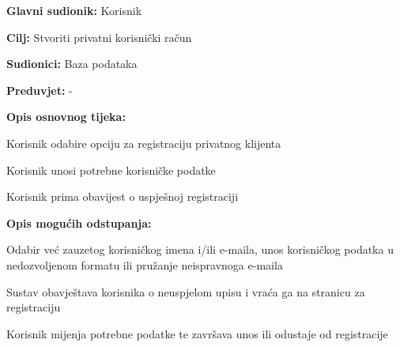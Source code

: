 			
					\noindent {}
					\begin{packed_item}
						
						\item \textbf{Glavni sudionik: } Korisnik
						\item  \textbf{Cilj:} Stvoriti privatni korisnički račun
						\item  \textbf{Sudionici:} Baza podataka
						\item  \textbf{Preduvjet:} -
						\item  \textbf{Opis osnovnog tijeka:}
						
						\item[] \begin{packed_enum}
							
							\item Korisnik odabire opciju za registraciju privatnog klijenta
							\item Korisnik unosi potrebne korisničke podatke
							\item Korisnik prima obavijest o uspješnoj registraciji
						\end{packed_enum}
						
						\item  \textbf{Opis mogućih odstupanja:}
						
						\item[] \begin{packed_item}
							
							\item[2.a]  Odabir već zauzetog korisničkog imena i/ili e-maila, unos korisničkog podatka u nedozvoljenom formatu ili pružanje neispravnoga e-maila
							\item[] \begin{packed_enum}
								
								\item Sustav obavještava korisnika o neuspjelom upisu i vraća ga na stranicu za registraciju
								\item  Korisnik mijenja potrebne podatke te završava unos ili odustaje od registracije
								
							\end{packed_enum}
						\end{packed_item}
					\end{packed_item}
				
